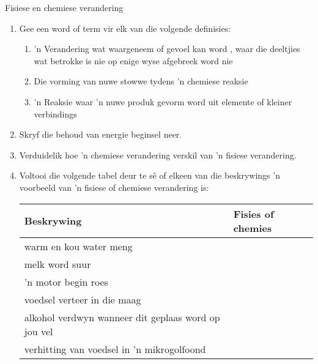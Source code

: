             \begin{eocexercises}{Fisiese en chemiese verandering}
            \nopagebreak
      \label{m38711*id65631}\begin{enumerate}[noitemsep, label=\textbf{\arabic*}. ] 
            \label{m38711*uid6234}\item Gee een word of term vir elk van die volgende definisies:
\label{m38711*id632243}\begin{enumerate}[noitemsep, label=\textbf{\alph*}. ] 
            \item 'n Verandering wat waargeneem of gevoel kan word , waar die deeltjies wat betrokke is nie op enige wyse afgebreek word nie
\item Die vorming van nuwe stowwe tydens 'n chemiese reaksie
\item 'n Reaksie waar 'n nuwe produk gevorm word uit elemente of kleiner verbindings \end{enumerate}
\label{m38711*id63272}\item Skryf die behoud van energie beginsel neer.\newline
\label{m38711*id6244}\item Verduidelik hoe 'n chemiese verandering verskil van 'n fisiese verandering.\newline
\label{m38711*uid52}\item Voltooi die volgende tabel deur te sê of elkeen van die beskrywings 'n voorbeeld van 'n fisiese of chemiese verandering is:
          \begin{table}[H]
        \begin{center}
      \label{m38711*id65648}
    \noindent
      \begin{tabular}{|l|l|}\hline
        \textbf{Beskrywing} &
        \textbf{Fisies of chemies} \\ \hline
        warm en kou water meng &
     \\ \hline
        melk word suur &
     \\ \hline
        'n motor begin roes &
       \\ \hline
        voedsel verteer in die maag &
       \\ \hline
        alkohol verdwyn wanneer dit geplaas word op jou vel &
       \\ \hline
       verhitting van voedsel in 'n mikrogolfoond &

\end{tabular}
\end{center}
\end{table}
\end{enumerate}
\end{eocexercises}
